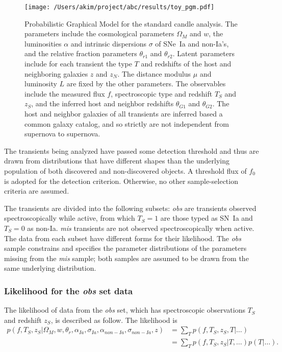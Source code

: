 \documentclass[preprint,3p]{elsarticle}
\begin{document}
\begin{figure}[htbp] %
   \centering
   \texttt{[image: /Users/akim/project/abc/results/toy\_pgm.pdf]} 
   \caption{Probabilistic Graphical Model for the standard candle analysis. The
   parameters include the cosmological parameters $\Omega_M$ and $w$,
   the luminosities $\alpha$ and intrinsic dispersions $\sigma$ of SNe~Ia and non-Ia's,
   and the relative fraction parameters $\theta_{r1}$ and $\theta_{r2}$.  Latent parameters
   include 
   for each transient the type $T$ and redshifts of the host and neighboring galaxies $z$ and $z_N$.  The  distance modulus $\mu$ and
   luminosity $L$ are fixed by the other parameters.  The observables include the measured
   flux $f$, spectroscopic type and redshift $T_S$ and $z_S$, and
   the inferred host and neighbor redshifts $\theta_{G1}$ and $\theta_{G2}$.
   The host and neighbor galaxies of all transients are inferred based a common galaxy catalog, 
   and so strictly are not independent from supernova to supernova.
   \label{toypgm:fig}}
\end{figure}


The transients being analyzed have passed some detection threshold
and thus are drawn from
distributions that have different shapes than the underlying population of both discovered and
non-discovered objects. A  threshold flux of $f_0$ is adopted for the detection criterion.
Otherwise, no other sample-selection criteria are assumed.

The transients are divided into
the following subsets:
{\it obs} are transients observed spectroscopically while active, from which $T_S=1$ are those typed
as SN~Ia and $T_S=0$ as non-Ia.  {\it mis} transients are not observed
spectroscopically when active.  The data from each subset have different forms for their likelihood.
The  {\it obs} sample constrains and specifies the parameter distributions of the 
parameters missing from the {\it mis} sample; both samples
are assumed to be drawn from the same underlying distribution.

\subsubsection{Likelihood for the {\it obs} set data}
\label{obs:sec}
The likelihood of data from the {\it obs} set, which has
spectroscopic observations $T_S$ and redshift
$z_S$, is described as follow.  The likelihood is
\begin{align}
p(f, {{T}}_S,{{z}}_S|  \Omega_M, w, \theta_r,\alpha_{Ia},\sigma_{Ia}, \alpha_{\mathit{non-Ia}},\sigma_{\mathit{non-Ia}}, z)  &=\sum_T
p(f, {{T}}_S,{{z}}_S, T| \ldots)\\
&= \sum_T 
p(f, {{T}}_S,{{z}}_S| T,\dots) p(T | \ldots).
\end{align}
\end{document}
